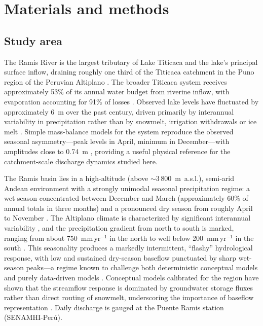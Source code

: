 \documentclass[a4paper,fleqn]{cas-sc}
\begin{document}
\section{Materials and methods}\label{sec:methods}

\subsection{Study area}\label{subsec:study-area}

The Ramis River is the largest tributary of Lake Titicaca and the
lake's principal surface inflow, draining roughly one third of the
Titicaca catchment in the Puno region of the Peruvian Altiplano
\citep{roche1992,lavado2012}. The broader Titicaca system receives
approximately 53\% of its annual water budget from riverine inflow,
with evaporation accounting for 91\% of losses \citep{cross2001}.
Observed lake levels have fluctuated by approximately 6~m over the past
century, driven primarily by interannual variability in precipitation
rather than by snowmelt, irrigation withdrawals or ice melt
\citep{lima2025,cross2001}. Simple mass-balance models for the system
reproduce the observed seasonal asymmetry---peak levels in April,
minimum in December---with amplitudes close to 0.74~m
\citep{cross2001,condom2004}, providing a useful physical reference
for the catchment-scale discharge dynamics studied here.

The Ramis basin lies in a high-altitude (above $\sim$3\,800~m~a.s.l.),
semi-arid Andean environment with a strongly unimodal seasonal
precipitation regime: a wet season concentrated between December and
March (approximately 60\% of annual totals in three months) and a
pronounced dry season from roughly April to November
\citep{condom2004}. The Altiplano climate is characterized by
significant interannual variability \citep{lima2025}, and the
precipitation gradient from north to south is marked, ranging from
about 750~mm\,yr$^{-1}$ in the north to well below 200~mm\,yr$^{-1}$
in the south \citep{condom2004}. This seasonality produces a markedly
intermittent, ``flashy'' hydrological response, with low and sustained
dry-season baseflow punctuated by sharp wet-season peaks---a regime
known to challenge both deterministic conceptual models
\citep{van2013,nauditt2017} and purely data-driven models
\citep{lees2021}. Conceptual models calibrated for the region have
shown that the streamflow response is dominated by groundwater storage
fluxes rather than direct routing of snowmelt, underscoring the
importance of baseflow representation \citep{nauditt2017}. Daily
discharge is gauged at the Puente Ramis station (SENAMHI-Per\'{u}).
\end{document}
